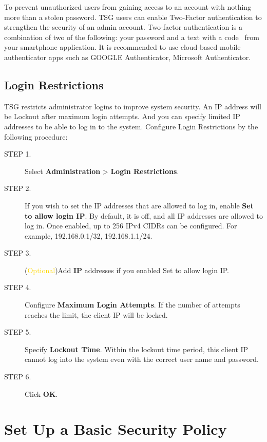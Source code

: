 To prevent unauthorized users from gaining access to an account with nothing more than a stolen password. 
TSG users can enable Two-Factor authentication to strengthen the security of an admin account. 
Two-factor authentication is a combination of two of the following: your password and a text with a code  from your smartphone application. 
It is recommended to use cloud-based mobile authenticator apps such as GOOGLE Authenticator, Microsoft Authenticator. 


\subsection*{\hypertarget{link:Login Restrictions}{Login Restrictions}}
\label{sec:intro:logging:restrictions}

TSG restricts administrator logins to improve system security. An IP address will be Lockout after maximum login attempts. 
And you can specify limited IP addresses to be able to log in to the system. Configure Login Restrictions by the following procedure: 


\begin{description}
    \item[STEP 1.]Select \textbf{Administration} > \textbf{Login Restrictions}.
    \item[STEP 2.]If you wish to set the IP addresses that are allowed to log in, enable \textbf{Set to allow login IP}. By default, it is off, and all IP addresses are allowed to log in. 
    Once enabled, up to 256 IPv4 CIDRs can be configured. For example, 192.168.0.1/32, 192.168.1.1/24.
    \item[STEP 3.](\textcolor{gold}{Optional})Add \textbf{IP} addresses if you enabled Set to allow login IP.
    \item[STEP 4.]Configure \textbf{Maximum Login Attempts}. If the number of attempts reaches the limit, the client IP will be locked. 
    \item[STEP 5.]Specify \textbf{Lockout Time}. Within the lockout time period, this client IP cannot log into the system even with the correct user name and password.
    \item[STEP 6.]Click \textbf{OK}.
\end{description}

\section*{\hypertarget{link:Set Up a Basic Security Policy}{Set Up a Basic Security Policy}}
\label{sec:intro:security}

